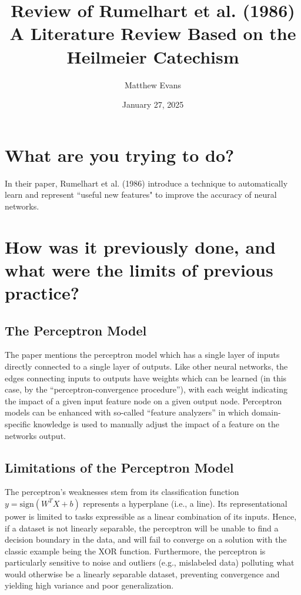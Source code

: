 \documentclass[10pt]{article}
\title{
    Review of Rumelhart et al. (1986) \\
    \large A Literature Review Based on the Heilmeier Catechism
}
\author{Matthew Evans}
\date{January 27, 2025}
\begin{document}
\maketitle

\section*{What are you trying to do?}

In their paper, Rumelhart et al. (1986) introduce a technique to automatically learn and represent ``useful new features" to improve the accuracy of neural networks.



\section*{How was it previously done, and what were the limits of previous practice?}
\subsection*{The Perceptron Model}


The paper mentions the perceptron model which has a single layer of inputs directly connected to a single layer of outputs. Like other neural networks, the edges connecting inputs to outputs have weights which can be learned (in this case, by the ``perceptron-convergence procedure''), with each weight indicating the impact of a given input feature node on a given output node. Perceptron models can be enhanced with so-called ``feature analyzers'' in which domain-specific knowledge is used to manually adjust the impact of a feature on the networks output.

\subsection*{Limitations of the Perceptron Model}

The perceptron's weaknesses stem from its classification function $y = \text{sign}(W^TX+b)$ represents a hyperplane (i.e., a line). Its representational power is limited to tasks expressible as a linear combination of its inputs. Hence, if a dataset is not linearly separable, the perceptron will be unable to find a decision boundary in the data, and will fail to converge on a solution with the classic example being the XOR function. Furthermore, the perceptron is particularly sensitive to noise and outliers (e.g., mislabeled data) polluting what would otherwise be a linearly separable dataset, preventing convergence and yielding high variance and poor generalization.
\end{document}
